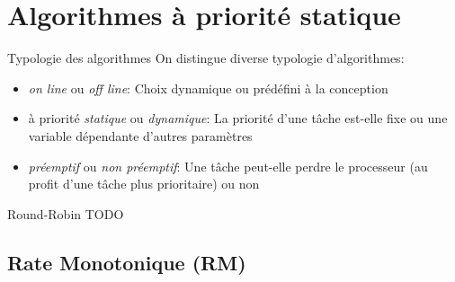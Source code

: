 \section{Algorithmes à priorité statique}

\begin{frame}{Typologie des algorithmes}
  On distingue diverse typologie d'algorithmes:
  \begin{itemize}
  \item  \emph{on  line}  ou   \emph{off  line}:  Choix  dynamique  ou
    prédéfini à la conception
  \item  à priorité \emph{statique}  ou \emph{dynamique}:  La priorité
    d'une  tâche est-elle  fixe  ou une  variable dépendante  d'autres
    paramètres 
  \item \emph{préemptif} ou  \emph{non préemptif}: Une tâche peut-elle
    perdre le  processeur (au profit d'une tâche  plus prioritaire) ou
    non
  \end{itemize}
\end{frame}

\begin{frame}{Round-Robin}
TODO
\end{frame} 

\subsection{Rate Monotonique (RM)}

